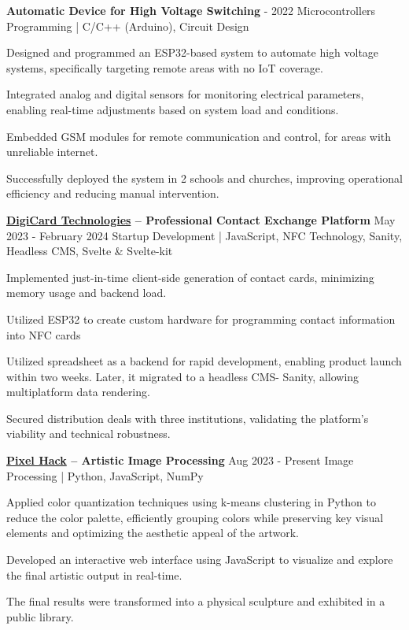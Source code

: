 \begin{rSection}
    \begin{rSubsection}
        {\bf Automatic Device for High Voltage Switching}
        { - 2022}
        {Microcontrollers Programming {\normalfont \small \ttfamily | C/C++ (Arduino), Circuit Design} }
        {}
        \item Designed and programmed an ESP32-based system to automate high voltage systems, specifically targeting remote areas with no IoT coverage.
        \item Integrated analog and digital sensors for monitoring electrical parameters, enabling real-time adjustments based on system load and conditions.
        \item Embedded GSM modules for remote communication and control, for areas with unreliable internet.
        \item Successfully deployed the system in 2 schools and churches, improving operational efficiency and reducing manual intervention.
    \end{rSubsection}

    \begin{rSubsection}
        {\bf \href{https://techmasterevent.com/project/1andonly}{DigiCard Technologies} – Professional Contact Exchange Platform}
        {\ttfamily May 2023 - February 2024}
        {Startup Development {\normalfont \small \ttfamily | JavaScript, NFC Technology, Sanity, Headless CMS, Svelte \& Svelte-kit} }
        {}
        \item Implemented just-in-time client-side generation of contact cards, minimizing memory usage and backend load.
        \item Utilized ESP32 to create custom hardware for programming contact information into NFC cards
        \item Utilized spreadsheet as a backend for rapid development, enabling product launch within two weeks. Later, it migrated to a headless CMS- Sanity, allowing multiplatform data rendering.
        \item Secured distribution deals with three institutions, validating the platform’s viability and technical robustness.
    \end{rSubsection}

    \begin{rSubsection}
        {\bf \href{https://pixel-hack.vercel.app/}{Pixel Hack} – Artistic Image Processing}
        {\ttfamily Aug 2023 - Present}
        {Image Processing {\normalfont \small \ttfamily | Python, JavaScript, NumPy} }
        {}
        \item Applied color quantization techniques using k-means clustering in Python to reduce the color palette, efficiently grouping colors while preserving key visual elements and optimizing the aesthetic appeal of the artwork.
        \item Developed an interactive web interface using JavaScript to visualize and explore the final artistic output in real-time.
        \item The final results were transformed into a physical sculpture and exhibited in a public library.
    \end{rSubsection}
    
    \begin{rSection}
        {}{}{}
    \end{rSection}
    

\end{rSection}